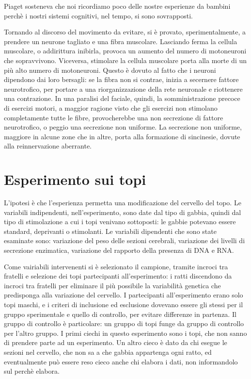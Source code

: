 Piaget sosteneva che noi ricordiamo poco delle nostre esperienze da bambini perchè i nostri sistemi cognitivi, nel tempo, si sono
sovrapposti.

Tornando al discorso del movimento da evitare, si è provato, sperimentalmente, a prendere un neurone tagliato e una fibra muscolare. 
Lasciando ferma la cellula muscolare, o addirittura inibirla, provoca un aumento del numero di motoneuroni che sopravvivono. Viceversa, 
stimolare la cellula muscolare porta alla morte di un più alto numero di motoneuroni. Questo è dovuto al fatto che i neuroni dipendono 
dai loro bersagli: se la fibra non si contrae, inizia a secernere fattore neurotrofico, per portare a una riorganizzazione della rete 
neuronale e riottenere una contrazione. In una paralisi del faciale, quindi, la somministrazione precoce di esercizi motori, a maggior 
ragione visto che gli esercizi non stimolano completamente tutte le fibre, provocherebbe una non secrezione di fattore neurotrofico, o 
peggio una secrezione non uniforme. La secrezione non uniforme, maggiore in alcune zone che in altre, porta alla formazione di 
sincinesie, dovute alla reinnervazione aberrante.

\section{Esperimento sui topi}
L'ipotesi è che l'esperienza permetta una modificazione del cervello del topo. Le variabili indipendenti, nell'esperimento, sono date 
dal tipo di gabbia, quindi dal tipo di stimolazione a cui i topi venivano sottoposti: le gabbie potevano essere standard, deprivanti o 
stimolanti.
Le variabili dipendenti che sono state esaminate sono: variazione del peso delle sezioni cerebrali, variazione dei livelli di 
secrezione enzimatica, variazione del rapporto della presenza di DNA e RNA.

Come vairiabili intervenenti si è selezionato il campione, tramite incroci tra fratelli e selezione dei topi partecipanti 
all'esperimento: i ratti discendono da incroci tra fratelli per eliminare il più possibile la variabilità genetica che predisponga alla 
variazione del cervello. I partecipanti all'esperimento erano solo topi maschi, e i criteri di inclusione ed esclusione dovevano essere 
gli stessi per il gruppo sperimentale e quello di controllo, per evitare differenze in partenza. Il gruppo di controllo è particolare: 
un gruppo di topi funge da gruppo di controllo per l'altro gruppo. 
I primi ciechi in questo esperimento sono i topi, che non sanno di prendere parte ad un esperimento. Un altro cieco è dato da chi 
esegue le sezioni nel cervello, che non sa a che gabbia appartenga ogni ratto, ed eventualmente può essere reso cieco anche chi elabora 
i dati, non informandolo sul perchè elabora.


